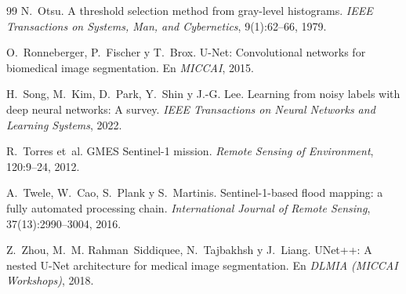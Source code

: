 \documentclass{article}
\begin{document}
\begin{thebibliography}{99}
N.~Otsu.
\newblock A threshold selection method from gray-level histograms.
\newblock \emph{IEEE Transactions on Systems, Man, and Cybernetics}, 9(1):62--66, 1979.

O.~Ronneberger, P.~Fischer y T.~Brox.
\newblock U-Net: Convolutional networks for biomedical image segmentation.
\newblock En \emph{MICCAI}, 2015.

H.~Song, M.~Kim, D.~Park, Y.~Shin y J.-G. Lee.
\newblock Learning from noisy labels with deep neural networks: A survey.
\newblock \emph{IEEE Transactions on Neural Networks and Learning Systems}, 2022.

R.~Torres et~al.
\newblock GMES Sentinel-1 mission.
\newblock \emph{Remote Sensing of Environment}, 120:9--24, 2012.

A.~Twele, W.~Cao, S.~Plank y S.~Martinis.
\newblock Sentinel-1-based flood mapping: a fully automated processing chain.
\newblock \emph{International Journal of Remote Sensing}, 37(13):2990--3004, 2016.

Z.~Zhou, M.~M. Rahman~Siddiquee, N.~Tajbakhsh y J.~Liang.
\newblock UNet++: A nested U-Net architecture for medical image segmentation.
\newblock En \emph{DLMIA (MICCAI Workshops)}, 2018.

\end{thebibliography}
\end{document}
